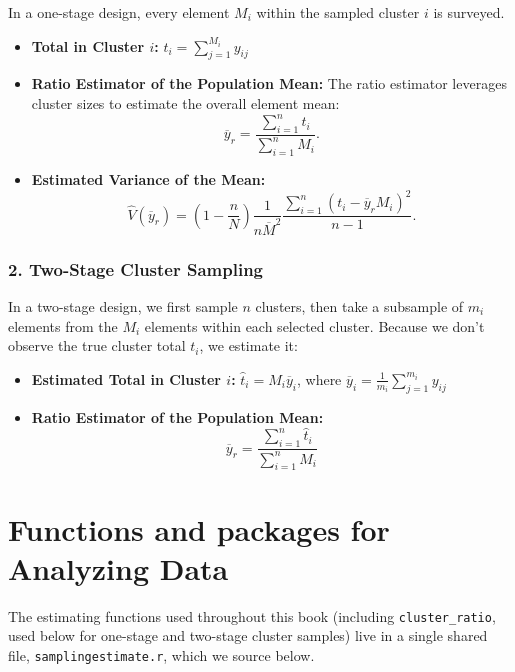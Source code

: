 \documentclass[
  letterpaper,
  DIV=11,
  numbers=noendperiod]{scrreprt}
\providecommand{\tightlist}{%
  \setlength{\itemsep}{0pt}\setlength{\parskip}{0pt}}
\let\oldrule\rule
\renewcommand{\rule}[2]{%
  \ifdim#1=0.5\linewidth
    \hrule %
  \else
    \oldrule{#1}{#2} %
  \fi
}
\renewcommand{\[}{\begin{equation}}
\renewcommand{\]}{\end{equation}}
\begin{document}
In a one-stage design, every element \(M_i\) within the sampled cluster
\(i\) is surveyed.

\begin{itemize}
\item
  \textbf{Total in Cluster \(i\):} \(t_i = \sum_{j=1}^{M_i} y_{ij}\)
\item
  \textbf{Ratio Estimator of the Population Mean:} The ratio estimator
  leverages cluster sizes to estimate the overall element mean: \[
  \overline{y}_r = \frac{\sum_{i=1}^n t_i}{\sum_{i=1}^n M_i}.
  \]
\item
  \textbf{Estimated Variance of the Mean:} \[
  \hat{V}(\overline{y}_r) = \left(1 - \frac{n}{N}\right) \frac{1}{n\overline{M}^2} \frac{\sum_{i=1}^n (t_i - \overline{y}_r M_i)^2}{n-1}.
  \]
\end{itemize}

\subsubsection*{2. Two-Stage Cluster
Sampling}\label{two-stage-cluster-sampling}

In a two-stage design, we first sample \(n\) clusters, then take a
subsample of \(m_i\) elements from the \(M_i\) elements within each
selected cluster. Because we don't observe the true cluster total
\(t_i\), we estimate it:

\begin{itemize}
\tightlist
\item
  \textbf{Estimated Total in Cluster \(i\):}
  \(\hat{t}_i = M_i \overline{y}_i\), where
  \(\overline{y}_i = \frac{1}{m_i} \sum_{j=1}^{m_i} y_{ij}\)
\item
  \textbf{Ratio Estimator of the Population Mean:} \[
  \overline{y}_r = \frac{\sum_{i=1}^n \hat{t}_i}{\sum_{i=1}^n M_i}
  \]
\end{itemize}

\begin{center}\rule{0.5\linewidth}{0.5pt}\end{center}

\section{Functions and packages for Analyzing
Data}\label{functions-and-packages-for-analyzing-data-2}

The estimating functions used throughout this book (including
\texttt{cluster\_ratio}, used below for one-stage and two-stage cluster
samples) live in a single shared file, \texttt{samplingestimate.r},
which we source below.
\end{document}
